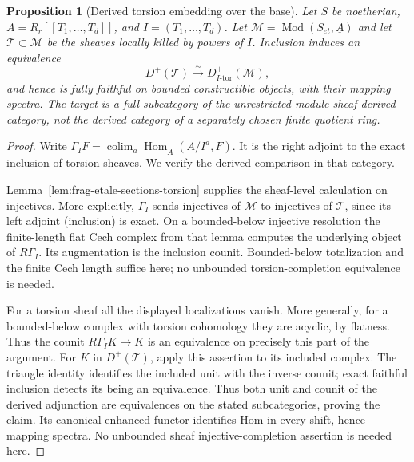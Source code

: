 \documentclass[11pt]{article}
\newtheorem{proposition}[theorem]{Proposition}
\theoremstyle{definition}
\theoremstyle{remark}
\begin{document}
\begin{proposition}[Derived torsion embedding over the base]
\label{prop:frag-sheaf-derived-torsion}
Let $S$ be noetherian, $A=R_r[[T_1,\ldots,T_d]]$, and $I=(T_1,\ldots,T_d)$.
Let $\mathcal M=\operatorname{Mod}(S_{\acute et},\underline A)$ and let
$\mathcal T\subset\mathcal M$ be the sheaves locally killed by powers
of $I$.  Inclusion induces an equivalence
\[
D^+(\mathcal T)\xrightarrow{\sim}D^+_{I\text{-tor}}(\mathcal M),
\]
and hence is fully faithful on bounded constructible objects, with their
mapping spectra.  The target is a full subcategory of the unrestricted
module-sheaf derived category, not the derived category of a separately
chosen finite quotient ring.
\end{proposition}

\begin{proof}
Write $\Gamma_I F=\operatorname*{colim}_a\underline{\operatorname{Hom}}_A
(A/I^a,F)$.  It is the right adjoint to the exact inclusion of torsion
sheaves.  We verify the derived comparison in that category.

Lemma~\ref{lem:frag-etale-sections-torsion} supplies the sheaf-level
calculation on injectives.  More explicitly, $\Gamma_I$ sends
injectives of $\mathcal M$ to injectives of $\mathcal T$, since its
left adjoint (inclusion) is exact.  On a bounded-below injective
resolution the finite-length flat Cech complex from that lemma
computes the underlying object of $R\Gamma_I$.  Its augmentation
is the inclusion counit.
Bounded-below totalization and the finite Cech length suffice here;
no unbounded torsion-completion equivalence is needed.

For a torsion sheaf all the displayed localizations vanish.  More
generally, for a bounded-below complex with torsion cohomology they
are acyclic, by flatness.  Thus the counit
$R\Gamma_I K\to K$ is an equivalence on precisely this part of the
argument.  For $K$ in $D^+(\mathcal T)$, apply this assertion to its included
complex.  The triangle identity identifies the included unit with
the inverse counit; exact faithful inclusion detects its being an
equivalence.  Thus both unit and counit of the derived adjunction
are equivalences on the stated subcategories, proving the claim.  Its canonical enhanced functor identifies
Hom in every shift, hence mapping spectra.  No unbounded sheaf
injective-completion assertion is needed here.
\end{proof}
\end{document}
